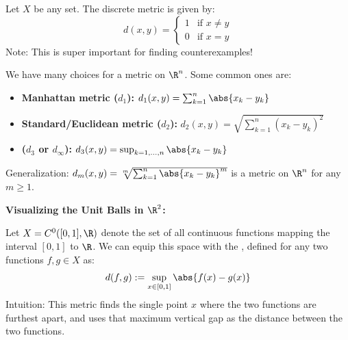 \begin{example*}
Let $X$ be any set. The discrete metric is given by:
\[
d(x,y) = 
\begin{cases} 
1 & \text{if } x \ne y \\ 
0 & \text{if } x = y 
\end{cases}
\]
\textcolor{eGray}{Note: This is super important for finding counterexamples!}
\end{example*}

\begin{example*}[Metrics in $\R^n$]
We have many choices for a metric on $\R^n$. Some common ones are:
\begin{itemize}
    \item \textbf{Manhattan metric ($d_1$):} $d_1(x,y) = \sum_{k=1}^n \abs{x_k - y_k}$
    \item \textbf{Standard/Euclidean metric ($d_2$):} $d_2(x,y) = \sqrt{\sum_{k=1}^n (x_k - y_k)^2}$
    \item \textcolor{eDarkGreen}{} \textbf{($d_3$ or $d_\infty$):} $d_3(x,y) = \sup_{k=1,\dots,n} \abs{x_k - y_k}$
\end{itemize}
\textcolor{eGray}{Generalization:} $d_m(x,y) = \sqrt[m]{\sum_{k=1}^n \abs{x_k - y_k}^m}$ is a metric on $\R^n$ for any $m \ge 1$.

\begin{center}
\textbf{Visualizing the Unit Balls in $\R^2$:} \\
\vspace{0.3cm}
\end{center}
\end{example*}

\begin{example*}
Let $X = C^0([0,1], \R)$ denote the set of all continuous functions mapping the interval $[0,1]$ to $\R$. We can equip this space with the \textcolor{eDarkGreen}{}, defined for any two functions $f,g \in X$ as:
\[ d(f,g) := \sup_{x \in [0,1]} \abs{f(x) - g(x)} \]
\textcolor{eGray}{Intuition: This metric finds the single point $x$ where the two functions are furthest apart, and uses that maximum vertical gap as the distance between the two functions.}
\end{example*}

